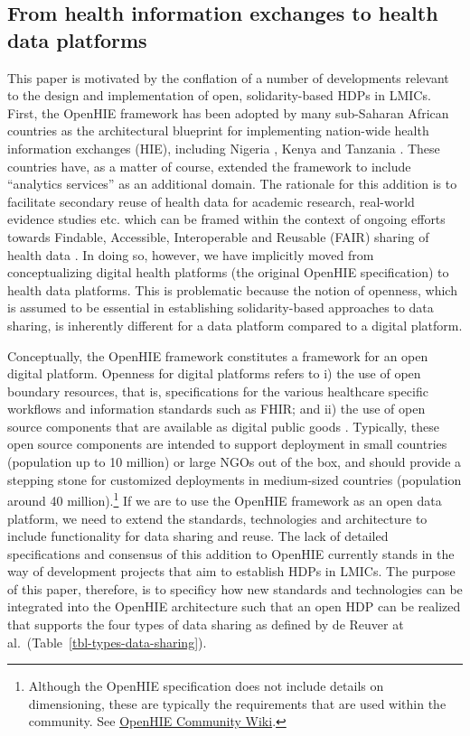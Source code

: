 \documentclass[
  authoryear]{elsarticle}
\begin{document}
\subsection{From health information exchanges to health data
platforms}\label{from-health-information-exchanges-to-health-data-platforms}

This paper is motivated by the conflation of a number of developments
relevant to the design and implementation of open, solidarity-based HDPs
in LMICs. First, the OpenHIE framework \citep{openhie} has been adopted
by many sub-Saharan African countries \citep{mamuye2022health} as the
architectural blueprint for implementing nation-wide health information
exchanges (HIE), including Nigeria \citep{dalhatu2023paper}, Kenya
\citep{thaiya2021adoption} and Tanzania \citep{nsaghurwe2021one}. These
countries have, as a matter of course, extended the framework to include
``analytics services'' as an additional domain. The rationale for this
addition is to facilitate secondary reuse of health data for academic
research, real-world evidence studies etc. which can be framed within
the context of ongoing efforts towards Findable, Accessible,
Interoperable and Reusable (FAIR) sharing of health data
\citep{guillot2023fair}. In doing so, however, we have implicitly moved
from conceptualizing digital health platforms (the original OpenHIE
specification) to health data platforms. This is problematic because the
notion of openness, which is assumed to be essential in establishing
solidarity-based approaches to data sharing, is inherently different for
a data platform compared to a digital platform.

Conceptually, the OpenHIE framework constitutes a framework for an open
digital platform. Openness for digital platforms refers to i) the use of
open boundary resources, that is, specifications for the various
healthcare specific workflows and information standards such as FHIR;
and ii) the use of open source components that are available as digital
public goods \citep{digitalpublicgoods}. Typically, these open source
components are intended to support deployment in small countries
(population up to 10 million) or large NGOs out of the box, and should
provide a stepping stone for customized deployments in medium-sized
countries (population around 40 million).\footnote{Although the OpenHIE
  specification does not include details on dimensioning, these are
  typically the requirements that are used within the community. See
  \href{https://wiki.ohie.org/display/CP/Interoperability+Layer+-+Use+Cases+and+Requirements}{OpenHIE
  Community Wiki}.} If we are to use the OpenHIE framework as an open
data platform, we need to extend the standards, technologies and
architecture to include functionality for data sharing and reuse. The
lack of detailed specifications and consensus of this addition to
OpenHIE currently stands in the way of development projects that aim to
establish HDPs in LMICs. The purpose of this paper, therefore, is to
specificy how new standards and technologies can be integrated into the
OpenHIE architecture such that an open HDP can be realized that supports
the four types of data sharing as defined by de Reuver at
al.~(Table~\ref{tbl-types-data-sharing}).
\end{document}
